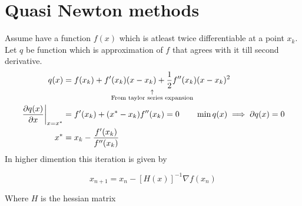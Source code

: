 \section{Quasi Newton methods}
\begin{slide}
	Assume have a function $f(x)$ which is atleast twice differentiable at a point $x_k$. Let $q$ be function which is approximation of $f$ that agrees with it till second derivative.
	\begin{align*}
	q(x) &= \explain{f(x_k) + f'(x_k)(x-x_k) + {1\over 2} f''(x_k)(x-x_k)^2}{\text{From taylor series expansion}}
	\\
	\left.{\partial q(x) \over \partial x}\right|_{x=x^*} &= f'(x_k) + (x^*-x_k)f''(x_k) = 0
	\qquad\min q(x) \implies \partial q(x) = 0
	\\
	x^* &= x_k-{f'(x_k)\over f''(x_k)}
	\end{align*}
	In higher dimention this iteration is given by
	\begin{shaded}
	$$x_{n+1} = x_n - [H(x)]^{-1}\nabla f(x_n)$$
	\end{shaded}
	Where $H$ is the hessian matrix
\end{slide}

